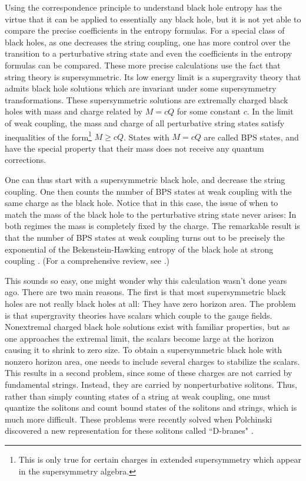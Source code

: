 Using the correspondence principle to understand black hole entropy
has the virtue that it can be applied to 
essentially any black hole, but it is not yet able to compare the
precise coefficients in the entropy formulas. For a special class of
black holes, as one decreases the string coupling,
one  has more control over the transition to a perturbative string
state and even the coefficients in the entropy formulas
can be compared. These more precise calculations use the fact that
string theory is supersymmetric. Its low energy limit is a supergravity
theory that admits black hole solutions  which are invariant under
some supersymmetry transformations. These 
supersymmetric solutions are extremally charged black holes with mass
and charge related by $M=cQ$ for some constant $c$.
In the limit of weak coupling, the mass and charge of
all perturbative string states 
satisfy inequalities of the form\footnote{This is only true for certain
charges in extended supersymmetry which appear in the supersymmetry algebra.}
$M\ge cQ$.
States with $M= cQ$ are called BPS states, and have the special property
that their mass does not receive any quantum corrections.

One can thus start with a supersymmetric black hole, and decrease
the string coupling. One then counts the number of BPS states
at weak coupling with the same charge as the black hole. Notice that
in this case, the issue of when to match the mass of the black hole
to the perturbative string state never arises: In both regimes
the mass is completely fixed by the charge. The remarkable
result is that the number of BPS states at weak coupling
turns out to be precisely the exponential of the Bekenstein-Hawking
entropy of the black hole at strong coupling \cite{stva}. 
(For a comprehensive review, see \cite{malthe}.)

This sounds so easy, one might wonder why this calculation
wasn't done years ago. There are two main reasons. The first is that
most supersymmetric black holes  are not really black holes at all:
They have zero horizon area. The problem is
that supergravity theories have scalars which couple to the gauge fields.
Nonextremal charged black hole solutions exist with familiar properties, but
as one approaches the extremal limit, the scalars become large at the
horizon causing it to shrink to zero size.
To obtain a supersymmetric black hole with nonzero horizon area, one
needs to include several charges to stabilize the scalars. This 
results in a second problem, since some of these
charges are not carried by fundamental strings.  Instead, they
are carried by nonperturbative solitons. Thus, rather than simply counting
states of a string at weak coupling, one must quantize the solitons
and count bound states of the solitons and strings, which is much
more difficult. These problems were recently solved
when
Polchinski discovered a new representation for these solitons called
``D-branes" \cite{pol}. 

